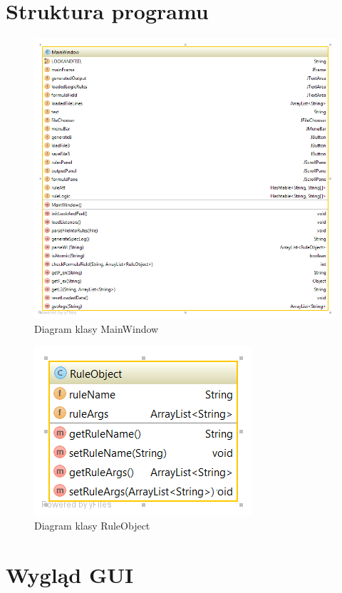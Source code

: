 \documentclass[a4paper, 11pt]{article}
\begin{document}
	\section{Struktura programu}
	\begin{figure}[H]
		\centerline{\includegraphics[scale=0.6]{diagram3}}
		\caption{Diagram klasy MainWindow}

	\end{figure}%
	\begin{figure}[H]
		\centerline{\includegraphics[scale=0.6]{diagram2}}
		\caption{Diagram klasy RuleObject}

	\end{figure}%
	\section{Wygląd GUI}
	
\end{document}
